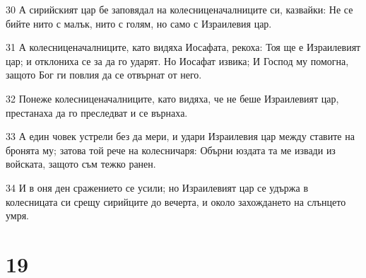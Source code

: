 \par 30 А сирийският цар бе заповядал на колесниценачалниците си, казвайки: Не се бийте нито с малък, нито с голям, но само с Израилевия цар.
\par 31 А колесниценачалниците, като видяха Иосафата, рекоха: Тоя ще е Израилевият цар; и отклониха се за да го ударят. Но Иосафат извика; И Господ му помогна, защото Бог ги повлия да се отвърнат от него.
\par 32 Понеже колесниценачалниците, като видяха, че не беше Израилевият цар, престанаха да го преследват и се върнаха.
\par 33 А един човек устрели без да мери, и удари Израилевия цар между ставите на бронята му; затова той рече на колесничаря: Обърни юздата та ме извади из войската, защото съм тежко ранен.
\par 34 И в оня ден сражението се усили; но Израилевият цар се удържа в колесницата си срещу сирийците до вечерта, и около захождането на слънцето умря.

\chapter{19}

